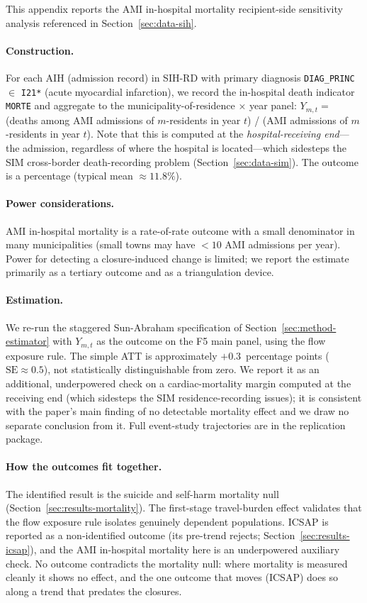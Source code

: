 This appendix reports the AMI in-hospital mortality recipient-side
sensitivity analysis referenced in Section~\ref{sec:data-sih}.

\paragraph{Construction.} For each AIH (admission record) in SIH-RD
with primary diagnosis \texttt{DIAG\_PRINC} $\in$ \texttt{I21*} (acute
myocardial infarction), we record the in-hospital death indicator
\texttt{MORTE} and aggregate to the municipality-of-residence × year
panel: $Y_{m, t} = $ (deaths among AMI admissions of $m$-residents
in year $t$) / (AMI admissions of $m$-residents in year $t$). Note
that this is computed at the \emph{hospital-receiving end}---the
admission, regardless of where the hospital is located---which
sidesteps the SIM cross-border death-recording problem (Section~\ref{sec:data-sim}).
The outcome is a percentage (typical mean $\approx 11.8\%$).

\paragraph{Power considerations.} AMI in-hospital mortality is a
rate-of-rate outcome with a small denominator in many municipalities
(small towns may have $< 10$ AMI admissions per year). Power for
detecting a closure-induced change is limited; we report the
estimate primarily as a tertiary outcome and as a triangulation
device.

\paragraph{Estimation.} We re-run the staggered Sun-Abraham specification
of Section~\ref{sec:method-estimator} with $Y_{m, t}$ as the outcome on the
F5 main panel, using the flow exposure rule. The simple ATT is
approximately $+0.3$~percentage points ($\mathrm{SE} \approx 0.5$), not
statistically distinguishable from zero. We report it as an additional,
underpowered check on a cardiac-mortality margin computed at the
receiving end (which sidesteps the SIM residence-recording issues); it
is consistent with the paper's main finding of no detectable mortality
effect and we draw no separate conclusion from it. Full event-study
trajectories are in the replication package.

\paragraph{How the outcomes fit together.} The identified result is the
suicide and self-harm mortality null (Section~\ref{sec:results-mortality}).
The first-stage travel-burden effect validates that the flow exposure
rule isolates genuinely dependent populations. ICSAP is reported as a
non-identified outcome (its pre-trend rejects;
Section~\ref{sec:results-icsap}), and the AMI in-hospital mortality here
is an underpowered auxiliary check. No outcome contradicts the mortality
null: where mortality is measured cleanly it shows no effect, and the
one outcome that moves (ICSAP) does so along a trend that predates the
closures.

